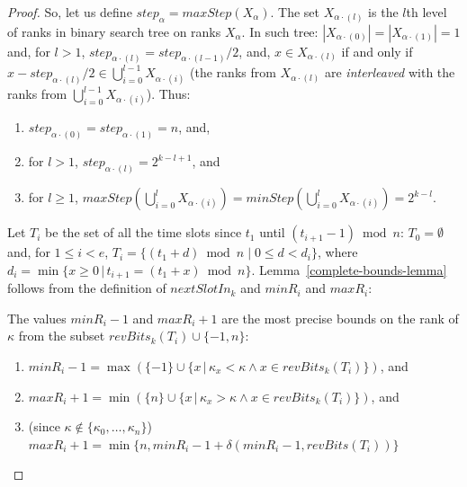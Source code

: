 \documentclass{llncs}
\begin{document}
\begin{proof}
So, let us define $step_\alpha=maxStep(X_\alpha)$. 
The %
set $X_{\alpha\cdot(l)}$ is the $l$th level of ranks in binary search tree on ranks
$X_{\alpha}$. 
In such tree:
$|X_{\alpha\cdot(0)}|=|X_{\alpha\cdot(1)}|=1$ and, 
for $l>1$, $step_{\alpha\cdot(l)}=step_{\alpha\cdot(l-1)}/2$,
and, $x\in X_{\alpha\cdot(l)}$ if and only if 
$x-step_{\alpha\cdot(l)}/2 \in  \bigcup_{i=0}^{l-1} X_{\alpha\cdot(i)}$
(the ranks from $X_{\alpha\cdot(l)}$ are {\em interleaved} with the ranks from $\bigcup_{i=0}^{l-1} X_{\alpha\cdot(i)}$).
Thus:
\begin{lemma}\label{step-lemma2}
\begin{enumerate}
\item
  $step_{\alpha\cdot(0)}=step_{\alpha\cdot(1)}=n$, and,
\item
  for $l>1$, $step_{\alpha\cdot(l)}=2^{k-l+1}$, and
\item\label{step-lemma2-interleaving}
  for $l\ge 1$, $maxStep(\bigcup_{i=0}^{l} X_{\alpha\cdot(i)})=minStep(\bigcup_{i=0}^{l} X_{\alpha\cdot(i)})=2^{k-l}$.
\end{enumerate}
\end{lemma}

Let $T_i$ be the set of all the time slots since $t_1$ until $(t_{i+1}-1)\bmod n$:
$T_0=\emptyset$ and, 
for $1\le i<e$, 
$T_i=\{(t_1+d)\bmod n\;|\; 0\le d< d_i\}$,
where $d_i=\min\{x\ge 0\,|\,t_{i+1}=(t_1+x)\bmod n\}$.
Lemma~\ref{complete-bounds-lemma} follows from the definition of $nextSlotIn_k$ and $minR_i$ and $maxR_i$:

\begin{lemma}\label{complete-bounds-lemma}
The values $minR_i-1$ and $maxR_i+1$ are the most precise bounds on the rank of $\kappa$
from the subset
$revBits_k(T_i)\cup\{-1,n\}$:
\begin{enumerate}
\item\label{complete-bounds-lemma-minR}
$minR_i-1=\max \left(\{-1\}\cup \{x\,|\, \kappa_x<\kappa \wedge x\in revBits_k(T_i) \}\right)$, and  
\item 
$maxR_i+1=\min \left(\{n\}\cup \{x\,|\, \kappa_x>\kappa \wedge x\in revBits_k(T_i) \}\right)$, and %
\item\label{complete-bounds-lemma-delta}
(since $\kappa\not\in\{\kappa_0,\ldots,\kappa_n\}$) 
$maxR_i+1=\min\{n, minR_i-1+\delta(minR_i-1,revBits(T_i))\}$
\end{enumerate}
\end{lemma}



\end{proof}
\end{document}
